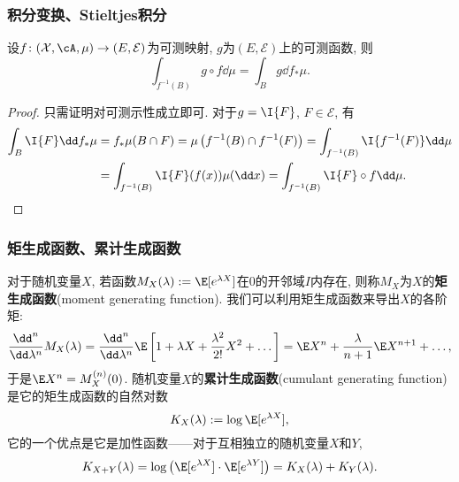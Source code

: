 \subsubsection{积分变换、Stieltjes积分}

\begin{theorem}[积分变换]\label{thm:IntegralTransform}
	设$f \colon (\mathcal{X}, \cA, \mu) \to (E, \mathcal{E})$为可测映射, $g$为$(E, \mathcal{E})$上的可测函数, 则
	\begin{equation*}
		\int_{f^{-1}(B)} g \circ f \dd \mu 
		= \int_B g \dd f_* \mu. 
	\end{equation*}
\end{theorem}
\begin{proof}
	只需证明对可测示性成立即可. 
	对于$g = \I{F}$, $F \in \mathcal{E}$, 有
	\begin{align*}
		\int_B \I{F} \dd f_* \mu
		&= f_* \mu(B \cap F)
		= \mu \left( f^{-1}(B) \cap f^{-1}(F) \right)
		= \int_{f^{-1}(B)} \I{f^{-1}(F)} \dd \mu \\
		&= \int_{f^{-1}(B)} \I{F}(f(x)) \mu(\dd x)
		=\int_{f^{-1}(B)} \I{F} \circ f \dd \mu. 
	\end{align*}
\end{proof}


\subsubsection{矩生成函数、累计生成函数}

对于随机变量$X$, 若函数$M_X(\lambda) := \E[e^{\lambda X}]$在$0$的开邻域$I$内存在, 则称$M_X$为$X$的\textbf{矩生成函数}(moment generating function).
我们可以利用矩生成函数来导出$X$的各阶矩: 
\begin{equation*}
	\frac{\dd^n}{\dd \lambda^n} M_X(\lambda)
	= \frac{\dd^n}{\dd \lambda^n} \E \left[ 1 + \lambda X + \frac{\lambda^2}{2!} X^2 + \dots \right]
	= \E X^n + \frac{\lambda}{n + 1} \E X^{n+1} + \dots, 
\end{equation*}
于是$\E X^n = M_X^{(n)}(0)$. 
随机变量$X$的\textbf{累计生成函数}(cumulant generating function)是它的矩生成函数的自然对数 
\begin{equation*}
	K_X(\lambda) := \log \E[e^{\lambda X}], 
\end{equation*}
它的一个优点是它是加性函数——对于互相独立的随机变量$X$和$Y$, 
\begin{equation*}
	K_{X+Y}(\lambda) 
	= \log \left(\E[e^{\lambda X}] \cdot \E[e^{\lambda Y}]\right)
	= K_X(\lambda) + K_Y(\lambda). 
\end{equation*}
 

